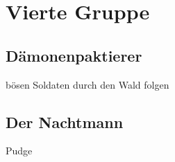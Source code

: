 \chapter{Vierte Gruppe}

\section{Dämonenpaktierer}
bösen Soldaten durch den Wald folgen
\section{Der Nachtmann}
Pudge